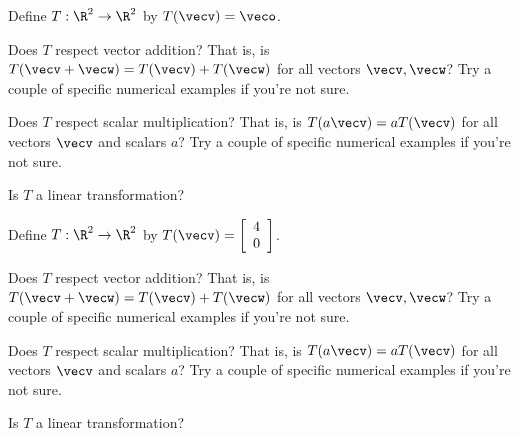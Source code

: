 
\edXsolution{ 
}

\endedxproblem



Define $T: \R^2 \rightarrow \R^2$ by $T(\vecv) = \veco$.  

Does $T$ respect vector addition?  That is, is $T(\vecv + \vecw) = T(\vecv) + T(\vecw)$ for all 
vectors $\vecv,\vecw$?
Try a couple of specific numerical examples if you're not sure.  


Does $T$ respect scalar multiplication?  
That is, is $T(a\vecv) = aT(\vecv)$ for all vectors $\vecv$ and scalars $a$?
Try a couple of specific numerical examples if you're not sure.  



Is $T$ a linear transformation?


\edXsolution{ 
}

\endedxproblem


Define $T: \R^2 \rightarrow \R^2$ by $T(\vecv) = \left[\begin{array}{c}
4 \\
0 
\end{array} \right]$.  

Does $T$ respect vector addition?  That is, is $T(\vecv + \vecw) = T(\vecv) + T(\vecw)$ for all 
vectors $\vecv,\vecw$?
Try a couple of specific numerical examples if you're not sure.  


Does $T$ respect scalar multiplication?  
That is, is $T(a\vecv) = aT(\vecv)$ for all vectors $\vecv$ and scalars $a$?
Try a couple of specific numerical examples if you're not sure.  



Is $T$ a linear transformation?


\edXsolution{ 
}

\endedxproblem


\endedxvertical



